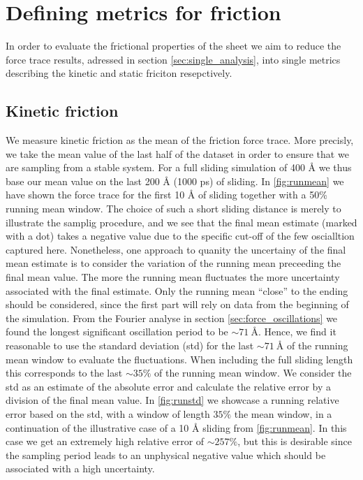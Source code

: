 \section{Defining metrics for friction}\label{sec:fric_metrics}

In order to evaluate the frictional properties of the sheet we aim to reduce the force trace results, adressed in section \cref{sec:single_analysis}, into single metrics describing the kinetic and static friciton resepctively. 

\subsection{Kinetic friction}
We measure kinetic friction as the mean of the friction force trace. More
precisly, we take the mean value of the last half of the dataset in order to
ensure that we are sampling from a stable system. For a full sliding simulation
of 400 Å we thus base our mean value on the last 200 Å (1000 ps) of sliding.
In \cref{fig:runmean} we have shown the force trace for the first 10 Å of
sliding together with a 50\% running mean window. The choice of such a short sliding distance is merely to illustrate the samplig procedure,
and we see that the final mean estimate (marked
with a dot) takes a negative value due to the specific cut-off of the few
oscialltion captured here. Nonetheless, one approach to quanity the uncertainy
of the final mean estimate is to consider the variation of the running mean
preceeding the final mean value. The more the running mean fluctuates the more
uncertainty associated with the final estimate. Only the running mean
``close'' to the ending should be considered, since the first part will rely on
data from the beginning of the simulation. From the Fourier analyse in section \cref{sec:force_oscillations} we found the longest significant oscillation period to be $\sim \SI{71}{\text{Å}}$. Hence, we find it reasonable to use the standard deviation (\acrshort{std}) for the last $\sim \SI{71}{\text{Å}}$ of the running mean window to evaluate the fluctuations. When including the full sliding length this corresponds to the last $\sim 35 \%$ of the running mean window. We consider the \acrshort{std} as an estimate of the absolute error and calculate the relative error by a division of the final mean value. In \cref{fig:runstd} we showcase a
running relative error based on the \acrshort{std}, with a window of length
$35 \%$ the mean window, in a continuation of the illustrative case of a 10 Å
sliding from \cref{fig:runmean}. In this case we get an extremely high relative error of $\sim 257\%$, but this is desirable since the sampling period leads to an unphysical negative value which should be associated with a high uncertainty. 

